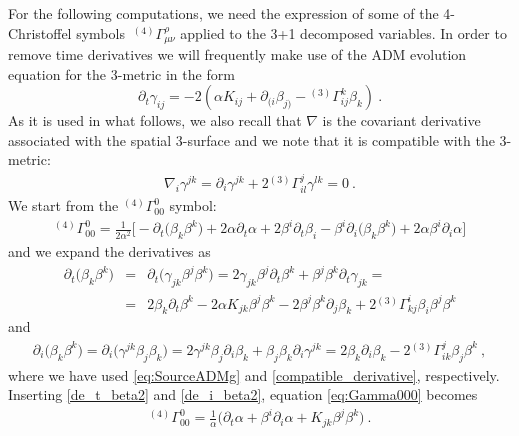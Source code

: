 \documentclass{article}
\begin{document}
For the following computations, we need the expression of some of the 4-Christoffel symbols
$\ {}^{(4)}\Gamma^\rho_{\mu\nu}$ applied to the 3+1 decomposed
variables. In order to remove time derivatives we will frequently make
use of the ADM evolution equation for the 3-metric in the form
%
\begin{equation}
  \label{eq:SourceADMg}
  \partial_t \gamma_{ij} = - 2 \left( \alpha K_{ij} + \partial_{(i}
  \beta_{j)} - {}^{(3)}\Gamma^k_{ij} \beta_k \right)\ .
\end{equation}
%
As it is used in what follows, we also recall that $\nabla$ is the
covariant derivative associated with the spatial 3-surface and we note that it is
compatible with the 3-metric:
%
\begin{eqnarray}
\label{compatible_derivative}
\nabla_i\gamma^{jk}=\partial_i\gamma^{jk} + 2{}^{(3)}\Gamma^j_{il}\gamma^{lk} = 0 \ .
\end{eqnarray}
%
We start from the ${}^{(4)}\Gamma^0_{00}$ symbol:
%
\begin{eqnarray}
\label{eq:Gamma000}
{}^{(4)}\Gamma^0_{00} = \frac{1}{2\alpha^2}\Big[
-\partial_t\big(\beta_k\beta^k\big)+2\alpha\partial_t\alpha
+ 2\beta^i\partial_t\beta_i - \beta^i\partial_i\big(\beta_k\beta^k\big) + 2\alpha\beta^i\partial_i\alpha\Big]
\end{eqnarray}
%
and we expand the derivatives as
%
\begin{eqnarray} \label{de_t_beta2}
\partial_t\big(\beta_k\beta^k\big) &=&
\partial_t\big(\gamma_{jk}\beta^j\beta^k\big) = 2\gamma_{jk}\beta^j\partial_t\beta^k +
\beta^j\beta^k\partial_t\gamma_{jk} = \nonumber \\
 &=& 2\beta_k\partial_t\beta^k -2\alpha K_{jk}
\beta^j\beta^k - 2\beta^j\beta^k\partial_j\beta_k + 2{}^{(3)}\Gamma^i_{kj} \beta_i\beta^j\beta^k
\end{eqnarray}
%
and
%
\begin{eqnarray}  \label{de_i_beta2}
\partial_i\big(\beta_k\beta^k\big) =
\partial_i\big(\gamma^{jk}\beta_j\beta_k\big) =
2\gamma^{jk}\beta_j\partial_i\beta_k + \beta_j\beta_k\partial_i\gamma^{jk} =
2\beta_k\partial_i\beta_k -2{}^{(3)}\Gamma^j_{ik}\beta_j\beta^k \ ,
\end{eqnarray}
%
where we have used \eqref{eq:SourceADMg} and
\eqref{compatible_derivative}, respectively.
Inserting \eqref{de_t_beta2} and \eqref{de_i_beta2}, equation
\eqref{eq:Gamma000} becomes
%
\begin{eqnarray}
  \label{eq:Gamma000_final}
{}^{(4)}\Gamma^0_{00} = \frac{1}{\alpha}\Big(\partial_t\alpha +
\beta^i\partial_i\alpha + K_{jk}\beta^j\beta^k \Big)\ .
\end{eqnarray}
\end{document}
